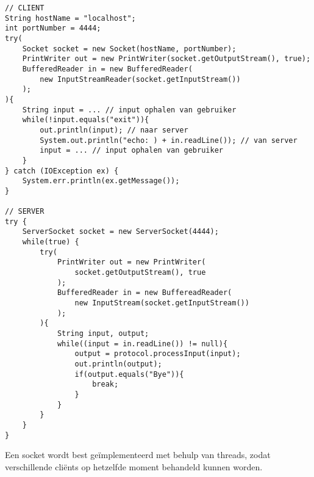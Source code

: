 \documentclass{report}
\begin{document}
\begin{lstlisting}
// CLIENT
String hostName = "localhost";
int portNumber = 4444;
try(
    Socket socket = new Socket(hostName, portNumber);
    PrintWriter out = new PrintWriter(socket.getOutputStream(), true);
    BufferedReader in = new BufferedReader(
        new InputStreamReader(socket.getInputStream())
    );
){
    String input = ... // input ophalen van gebruiker
    while(!input.equals("exit")){
        out.println(input); // naar server
        System.out.println("echo: ) + in.readLine()); // van server
        input = ... // input ophalen van gebruiker
    }
} catch (IOException ex) {
    System.err.println(ex.getMessage());
}

// SERVER
try {
    ServerSocket socket = new ServerSocket(4444);
    while(true) {
        try(
            PrintWriter out = new PrintWriter(
                socket.getOutputStream(), true
            );
            BufferedReader in = new BuffereadReader(
                new InputStream(socket.getInputStream())
            );
        ){
            String input, output;
            while((input = in.readLine()) != null){
                output = protocol.processInput(input);
                out.println(output);
                if(output.equals("Bye")){
                    break;
                }
            }
        }
    }
}
\end{lstlisting}

Een socket wordt best geïmplementeerd met behulp van threads, zodat verschillende cliënts op hetzelfde moment behandeld kunnen worden.
\end{document}
